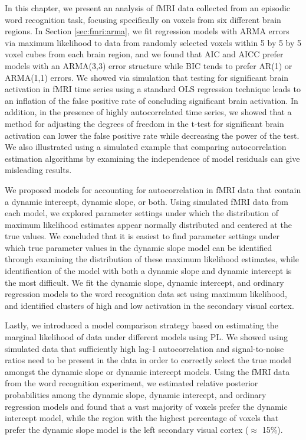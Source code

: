 In this chapter, we present an analysis of fMRI data collected from an episodic word recognition task, focusing specifically on voxels from six different brain regions. In Section \ref{sec:fmri:arma}, we fit regression models with ARMA errors via maximum likelihood to data from randomly selected voxels within 5 by 5 by 5 voxel cubes from each brain region, and we found that AIC and AICC prefer models with an ARMA(3,3) error structure while BIC tends to prefer AR(1) or ARMA(1,1) errors. We showed via simulation that testing for significant brain activation in fMRI time series using a standard OLS regression technique leads to an inflation of the false positive rate of concluding significant brain activation. In addition,  in the presence of highly autocorrelated time series, we showed that a method for adjusting the degrees of freedom in the t-test for significant brain activation can lower the false positive rate while decreasing the power of the test. We also illustrated using a simulated example that comparing autocorrelation estimation algorithms by examining the independence of model residuals can give misleading results.

We proposed models for accounting for autocorrelation in fMRI data that contain a dynamic intercept, dynamic slope, or both. Using simulated fMRI data from each model, we explored parameter settings under which the distribution of maximum likelihood estimates appear normally distributed and centered at the true values. We concluded that it is easiest to find parameter settings under which true parameter values in the dynamic slope model can be identified through examining the distribution of these maximum likelihood estimates, while identification of the model with both a dynamic slope and dynamic intercept is the most difficult. We fit the dynamic slope, dynamic intercept, and ordinary regression models to the word recognition data set using maximum likelihood, and identified clusters of high and low activation in the secondary visual cortex.

Lastly, we introduced a model comparison strategy based on estimating the marginal likelihood of data under different models using PL. We showed using simulated data that sufficiently high lag-1 autocorrelation and signal-to-noise ratios need to be present in the data in order to correctly select the true model amongst the dynamic slope or dynamic intercept models. Using the fMRI data from the word recognition experiment, we estimated relative posterior probabilities among the dynamic slope, dynamic intercept, and ordinary regression models and found that a vast majority of voxels prefer the dynamic intercept model, while the region with the highest percentage of voxels that prefer the dynamic slope model is the left secondary visual cortex ($\approx$ 15\%).

